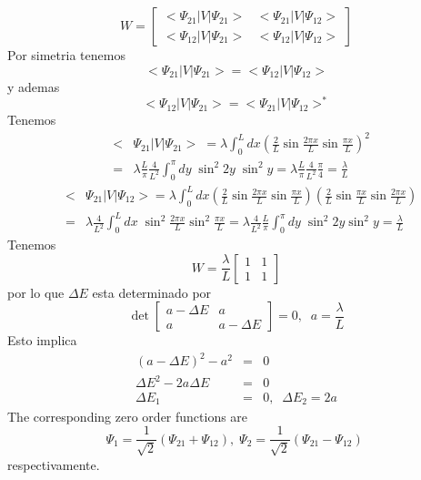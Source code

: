 \[
W=\left[ 
\begin{array}{cc}
<\Psi _{21}|V|\Psi _{21}> & <\Psi _{21}|V|\Psi _{12}> \\ 
<\Psi _{12}|V|\Psi _{21}> & <\Psi _{12}|V|\Psi _{12}>%
\end{array}%
\right] 
\]%
Por simetria tenemos%
\[
<\Psi _{21}|V|\Psi _{21}>=<\Psi _{12}|V|\Psi _{12}>
\]%
y ademas%
\[
<\Psi _{12}|V|\Psi _{21}>=<\Psi _{21}|V|\Psi _{12}>^{\ast }
\]%
Tenemos%
\begin{eqnarray*}
&<&\Psi _{21}|V|\Psi _{21}>\;=\lambda \int_{0}^{L}dx\left( \frac{2}{L}\sin 
\frac{2\pi x}{L}\sin \frac{\pi x}{L}\right) ^{2} \\
&=&\lambda \frac{L}{\pi }\frac{4}{L^{2}}\int_{0}^{\pi }dy\;\sin ^{2}2y\;\sin
^{2}y=\lambda \frac{L}{\pi }\frac{4}{L^{2}}\frac{\pi }{4}=\frac{\lambda }{L}
\end{eqnarray*}%
\begin{eqnarray*}
&<&\Psi _{21}|V|\Psi _{12}>=\lambda \int_{0}^{L}dx\left( \frac{2}{L}\sin 
\frac{2\pi x}{L}\sin \frac{\pi x}{L}\right) \left( \frac{2}{L}\sin \frac{\pi
x}{L}\sin \frac{2\pi x}{L}\right)  \\
&=&\lambda \frac{4}{L^{2}}\int_{0}^{L}dx\;\sin ^{2}\frac{2\pi x}{L}\sin ^{2}%
\frac{\pi x}{L}=\lambda \frac{4}{L^{2}}\frac{L}{\pi }\int_{0}^{\pi }dy\;\sin
^{2}2y\sin ^{2}y=\frac{\lambda }{L}
\end{eqnarray*}%
Tenemos%
\[
W=\frac{\lambda }{L}\left[ 
\begin{array}{cc}
1 & 1 \\ 
1 & 1%
\end{array}%
\right] 
\]%
por lo que $\Delta E$ esta determinado por 
\[
\det \left[ 
\begin{array}{cc}
a-\Delta E & a \\ 
a & a-\Delta E%
\end{array}%
\right] =0,\;\;a=\frac{\lambda }{L}
\]%
Esto implica%
\begin{eqnarray*}
\left( a-\Delta E\right) ^{2}-a^{2} &=&0 \\
\Delta E^{2}-2a\Delta E &=&0 \\
\Delta E_{1} &=&0,\;\;\Delta E_{2}=2a
\end{eqnarray*}%
The corresponding zero order functions are%
\[
\Psi _{1}=\frac{1}{\sqrt{2}}\left( \Psi _{21}+\Psi _{12}\right) ,\;\Psi _{2}=%
\frac{1}{\sqrt{2}}\left( \Psi _{21}-\Psi _{12}\right) \;
\]%
respectivamente.


